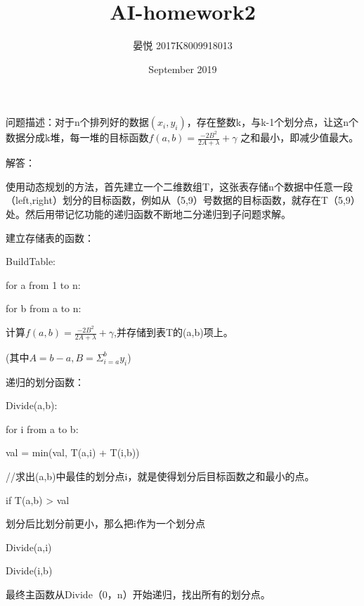 \documentclass{ctexart}
\title{AI-homework2}
\author{晏悦 2017K8009918013 }
\date{September 2019}
\begin{document}
\maketitle

问题描述：对于n个排列好的数据$(x_i,y_i)$，存在整数k，与k-1个划分点，让这n个数据分成k堆，每一堆的目标函数$f(a,b) = \frac{-2B^2}{2A + \lambda} + \gamma$ 之和最小，即减少值最大。

解答：

使用动态规划的方法，首先建立一个二维数组T，这张表存储n个数据中任意一段（left,right）划分的目标函数，例如从（5,9）号数据的目标函数，就存在T（5,9）处。然后用带记忆功能的递归函数不断地二分递归到子问题求解。

建立存储表的函数：

BuildTable:

for a from 1 to n:

for b from a to n:

计算$f(a,b) = \frac{-2B^2}{2A + \lambda} + \gamma$,并存储到表T的(a,b)项上。

(其中$A = b - a, B = \Sigma_{i=a}^b y_i$)



递归的划分函数：

Divide(a,b):

for i from a to b:

val = min(val, T(a,i) + T(i,b))

//求出(a,b)中最佳的划分点i，就是使得划分后目标函数之和最小的点。

if T(a,b) > val

划分后比划分前更小，那么把i作为一个划分点

Divide(a,i)

Divide(i,b)



最终主函数从Divide（0，n）开始递归，找出所有的划分点。
\end{document}
